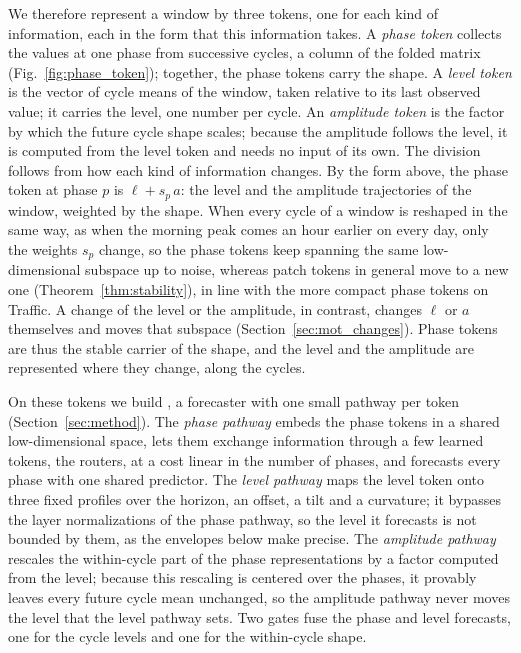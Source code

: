 {
We therefore represent a window by three tokens, one for each kind of information, each in the form that this information takes. A \emph{phase token} collects the values at one phase from successive cycles, a column of the folded matrix (Fig.~\ref{fig:phase_token}); together, the phase tokens carry the shape. A \emph{level token} is the vector of cycle means of the window, taken relative to its last observed value; it carries the level, one number per cycle. An \emph{amplitude token} is the factor by which the future cycle shape scales; because the amplitude follows the level, it is computed from the level token and needs no input of its own. The division follows from how each kind of information changes. By the form above, the phase token at phase $p$ is $\ell+s_p\,a$: the level and the amplitude trajectories of the window, weighted by the shape. When every cycle of a window is reshaped in the same way, as when the morning peak comes an hour earlier on every day, only the weights $s_p$ change, so the phase tokens keep spanning the same low-dimensional subspace up to noise, whereas patch tokens in general move to a new one (Theorem~\ref{thm:stability}), in line with the more compact phase tokens on Traffic. A change of the level or the amplitude, in contrast, changes $\ell$ or $a$ themselves and moves that subspace (Section~\ref{sec:mot_changes}). Phase tokens are thus the stable carrier of the shape, and the level and the amplitude are represented where they change, along the cycles.

\fakeparagraph{\sysplus}
On these tokens we build \textbf{\sysplus}, a forecaster with one small pathway per token (Section~\ref{sec:method}). The \emph{phase pathway} embeds the phase tokens in a shared low-dimensional space, lets them exchange information through a few learned tokens, the routers, at a cost linear in the number of phases, and forecasts every phase with one shared predictor. The \emph{level pathway} maps the level token onto three fixed profiles over the horizon, an offset, a tilt and a curvature; it bypasses the layer normalizations of the phase pathway, so the level it forecasts is not bounded by them, as the envelopes below make precise. The \emph{amplitude pathway} rescales the within-cycle part of the phase representations by a factor computed from the level; because this rescaling is centered over the phases, it provably leaves every future cycle mean unchanged, so the amplitude pathway never moves the level that the level pathway sets. Two gates fuse the phase and level forecasts, one for the cycle levels and one for the within-cycle shape.

}
